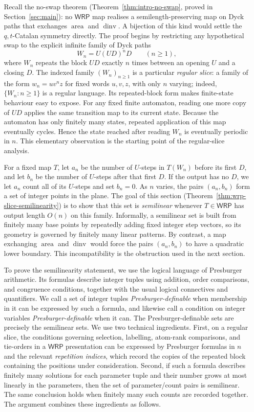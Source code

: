 \documentclass[11pt]{article}
\theoremstyle{definition}
\newcommand{\WRP}{\mathsf{WRP}}
\newcommand{\area}{\operatorname{area}}
\newcommand{\dinv}{\operatorname{dinv}}
\begin{document}
Recall the no-swap theorem (Theorem~\ref{thm:intro-no-swap}, proved in
Section~\ref{sec:main}): no $\WRP$ map realises a semilength-preserving map on
Dyck paths that exchanges $\area$ and $\dinv$.  A bijection of this kind would settle
the $q,t$-Catalan symmetry directly.  The proof begins by restricting any
hypothetical swap to the explicit infinite family of Dyck paths
\[
   W_n=U(UD)^nD\qquad (n\ge 1),
\]
where $W_n$ repeats the block $UD$ exactly $n$ times between an
opening $U$ and a closing $D$.  The indexed family $(W_n)_{n\ge1}$ is a
particular \emph{regular slice}: a family
of the form $w_n=uv^nz$ for fixed words $u,v,z$, with only $n$ varying;
indeed, $\{W_n:n\ge 1\}$ is a regular language.  Its repeated-block form makes
finite-state behaviour easy to expose.  For any fixed finite automaton, reading
one more copy of $UD$ applies the same transition map to its current state.
Because the automaton has only finitely many states, repeated application of
this map eventually cycles.  Hence the state reached after reading $W_n$ is
eventually periodic in $n$.  This elementary observation is the starting point
of the regular-slice analysis.

For a fixed map $T$, let $a_n$ be the number of $U$-steps in
$T(W_n)$ before its first $D$, and let $b_n$ be the number of $U$-steps after
that first $D$.  If the output has no $D$, we let $a_n$ count all of its
$U$-steps and set $b_n=0$.  As $n$ varies, the pairs $(a_n,b_n)$ form a set of
integer points in the plane.  The goal of this section
(Theorem~\ref{thm:wrp-slice-semilinearity}) is to show that this set is
\emph{semilinear} whenever $T\in\WRP$ has output length $O(n)$ on this family.
Informally, a semilinear set is built from finitely many base points by
repeatedly adding fixed integer step vectors, so its geometry is governed by
finitely many linear patterns.  By contrast, a map exchanging $\area$ and
$\dinv$ would force the pairs $(a_n,b_n)$ to have a quadratic lower boundary.
This incompatibility is the obstruction used in the next section.

To prove the semilinearity statement, we use the logical language of
Presburger arithmetic.  Its formulas describe integer tuples using addition,
order comparisons, and congruence conditions, together with the usual logical
connectives and quantifiers.  We call a set of integer tuples
\emph{Presburger-definable} when membership in it can be expressed by such a
formula, and likewise call a condition on integer variables
\emph{Presburger-definable} when it can.  The Presburger-definable sets are
precisely the semilinear sets.  We
use two technical ingredients.  First, on a regular slice, the
conditions governing selection, labelling, atom-rank comparisons, and
tie-orders in a $\WRP$ presentation can be expressed by Presburger formulas in
$n$ and the relevant \emph{repetition indices}, which record the copies of the
repeated block containing the positions under consideration.  Second, if such a
formula describes finitely many solutions for each parameter tuple and their
number grows at most linearly in the parameters, then the set of
parameter/count pairs is semilinear.  The same conclusion holds when finitely
many such counts are recorded together.  The argument combines these
ingredients as follows.
\end{document}
